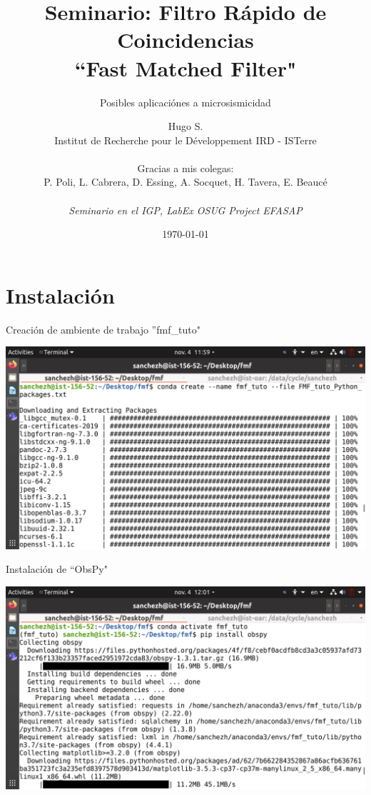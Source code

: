 \documentclass{beamer}
\title{{\normalsize \vskip 1cm Seminario: Filtro R\'apido de Coincidencias \\ \hskip 2cm ``Fast Matched Filter"}}
\subtitle{\small Posibles aplicaciónes a microsismicidad}
\author{Hugo S. \\ {\tiny Institut de Recherche pour le Développement IRD - ISTerre} \\ 
\\
Gracias a mis colegas: \\
P. Poli, L. Cabrera, D. Essing, A. Socquet, H. Tavera, E. Beauc\'e \\
\\
\textit{Seminario en el IGP, LabEx OSUG Project EFASAP}
}
\date[2022]{\today}
\begin{document}

\begin{frame}
    \titlepage
\end{frame}

\section{Instalaci\'on}




\begin{frame}
{Creaci\'on de ambiente de trabajo ''fmf\_tuto"}

 \centering
 \includegraphics[width=1\linewidth]{images/conda_create_fmf.png}
 
\end{frame}

\begin{frame}
 {Instalaci\'on de ``ObsPy"}
 
 \centering
 \includegraphics[width=1\linewidth]{images/conda_activate_fmf_install_obspy.png}
 
\end{frame}
\end{document}
